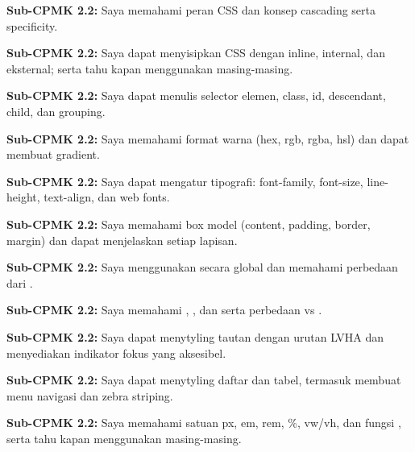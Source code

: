 \documentclass[../main.tex]{subfiles}
\begin{document}
\begin{checklist}
  \item \textbf{Sub-CPMK 2.2:} Saya memahami peran CSS dan konsep cascading serta specificity.
  \item \textbf{Sub-CPMK 2.2:} Saya dapat menyisipkan CSS dengan inline, internal, dan eksternal; serta tahu kapan menggunakan masing-masing.
  \item \textbf{Sub-CPMK 2.2:} Saya dapat menulis selector elemen, class, id, descendant, child, dan grouping.
  \item \textbf{Sub-CPMK 2.2:} Saya memahami format warna (hex, rgb, rgba, hsl) dan dapat membuat gradient.
  \item \textbf{Sub-CPMK 2.2:} Saya dapat mengatur tipografi: font-family, font-size, line-height, text-align, dan web fonts.
  \item \textbf{Sub-CPMK 2.2:} Saya memahami box model (content, padding, border, margin) dan dapat menjelaskan setiap lapisan.
  \item \textbf{Sub-CPMK 2.2:} Saya menggunakan  secara global dan memahami perbedaan dari .
  \item \textbf{Sub-CPMK 2.2:} Saya memahami , , dan  serta perbedaan  vs .
  \item \textbf{Sub-CPMK 2.2:} Saya dapat menytyling tautan dengan urutan LVHA dan menyediakan indikator fokus yang aksesibel.
  \item \textbf{Sub-CPMK 2.2:} Saya dapat menytyling daftar dan tabel, termasuk membuat menu navigasi dan zebra striping.
  \item \textbf{Sub-CPMK 2.2:} Saya memahami satuan px, em, rem, \%, vw/vh, dan fungsi , serta tahu kapan menggunakan masing-masing.
\end{checklist}
\end{document}
